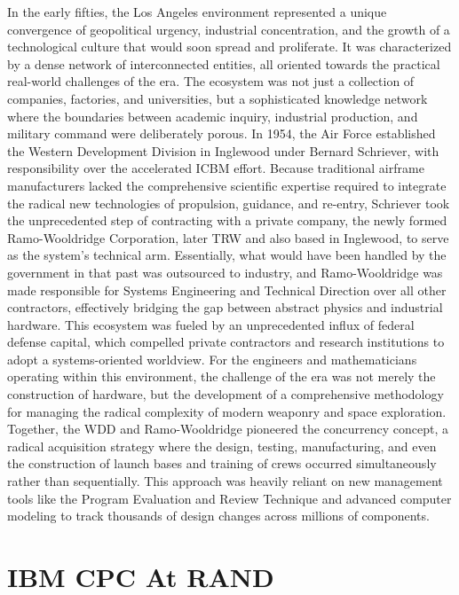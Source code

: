 In the early fifties, the Los Angeles environment represented a unique convergence of geopolitical urgency, industrial concentration, and the growth of a technological culture that would soon spread and proliferate. It was characterized by a dense network of interconnected entities, all oriented towards the practical real-world challenges of the era. The ecosystem was not just a collection of companies, factories, and universities, but a sophisticated knowledge network where the boundaries between academic inquiry, industrial production, and military command were deliberately porous. In 1954, the Air Force established the Western Development Division in Inglewood under Bernard Schriever, with responsibility over the accelerated ICBM effort. Because traditional airframe manufacturers lacked the comprehensive scientific expertise required to integrate the radical new technologies of propulsion, guidance, and re-entry, Schriever took the unprecedented step of contracting with a private company, the newly formed Ramo-Wooldridge Corporation, later TRW and also based in Inglewood, to serve as the system's technical arm. Essentially, what would have been handled by the government in that past was outsourced to industry, and Ramo-Wooldridge was made responsible for Systems Engineering and Technical Direction over all other contractors, effectively bridging the gap between abstract physics and industrial hardware. This ecosystem was fueled by an unprecedented influx of federal defense capital, which compelled private contractors and research institutions to adopt a systems-oriented worldview. For the engineers and mathematicians operating within this environment, the challenge of the era was not merely the construction of hardware, but the development of a comprehensive methodology for managing the radical complexity of modern weaponry and space exploration. Together, the WDD and Ramo-Wooldridge pioneered the concurrency concept, a radical acquisition strategy where the design, testing, manufacturing, and even the construction of launch bases and training of crews occurred simultaneously rather than sequentially. This approach was heavily reliant on new management tools like the Program Evaluation and Review Technique and advanced computer modeling to track thousands of design changes across millions of components. \cite{sheehanFieryPeaceCold2009}

\section{IBM CPC At RAND}

